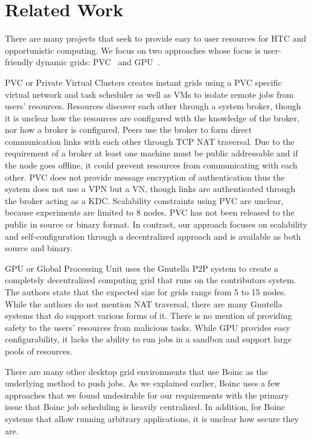 \documentclass{sig-alternate}
\begin{document}
\section{Related Work}
\label{related_work}
There are many projects that seek to provide easy to user resources for HTC
and opportunistic computing.  We focus on two approaches whose focus is
user-friendly dynamic grids: PVC~\cite{pvc} and GPU~\cite{gpu}.

PVC or Private Virtual Clusters creates instant grids using a PVC specific
virtual network and task scheduler as well as VMs to isolate remote jobs from
users' resources.  Resources discover each other through a system broker,
though it is unclear how the resources are configured with the knowledge of the
broker, nor how a broker is configured.  Peers use the broker to form direct
communication links with each other through TCP NAT traversal.  Due to the
requirement of a broker at least one machine must be public addressable and if
the node goes offline, it could prevent resources from communicating with each
other.  PVC does not provide message encryption of authentication thus the
system does not use a VPN but a VN, though links are authenticated through the
broker acting as a KDC.  Scalability constraints using PVC are unclear, because
experiments are limited to 8 nodes.  PVC has not been released to the public in
source or binary format.  In contrast, our approach focuses on scalability and
self-configuration through a decentralized approach and is available as both
source and binary.

GPU or Global Processing Unit uses the Gnutella P2P system to create
a completely decentralized computing grid that runs on the contributors system.
The authors state that the expected size for grids range from 5 to 15 nodes.  
While the authors do not mention NAT traversal, there are many Gnutella systems
that do support various forms of it.  There is no mention of providing safety
to the users' resources from malicious tasks.  While GPU provides easy
configurability, it lacks the ability to run jobs in a sandbox and support large
pools of resources.

There are many other desktop grid environments that use Boinc as the underlying
method to push jobs.  As we explained earlier, Boinc uses a few approaches that
we found undesirable for our requirements with the primary issue that Boinc job
scheduling is heavily centralized.  In addition, for Boinc systems that allow
running arbitrary applications, it is unclear how secure they are.
\end{document}
